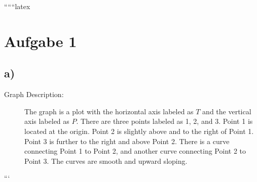 
``````latex


\section*{Aufgabe 1}

\subsection*{a)}

\begin{description}
    \item[Graph Description:] The graph is a plot with the horizontal axis labeled as \( T \) and the vertical axis labeled as \( P \). There are three points labeled as 1, 2, and 3. Point 1 is located at the origin. Point 2 is slightly above and to the right of Point 1. Point 3 is further to the right and above Point 2. There is a curve connecting Point 1 to Point 2, and another curve connecting Point 2 to Point 3. The curves are smooth and upward sloping.
\end{description}

```